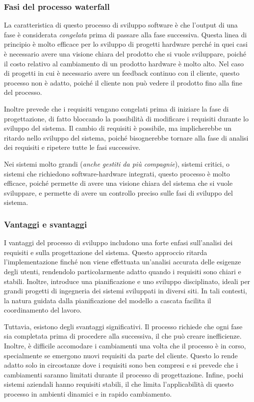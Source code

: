 \subsubsection{Fasi del processo waterfall}
La caratteristica di questo processo di sviluppo software è che l'output di una 
fase è considerata \textit{congelata} prima di passare alla fase successiva. 
Questa linea di principio è molto efficace per lo sviluppo di progetti hardware perché 
in quei casi è necessario avere una visione chiara del prodotto che si vuole sviluppare,
poiché il costo relativo al cambiamento di un prodotto hardware è molto alto.
Nel caso di progetti in cui è necessario avere un feedback continuo con il cliente,
questo processo non è adatto, poiché il cliente non può vedere il prodotto fino alla
fine del processo.

Inoltre prevede che i requisiti vengano congelati prima di iniziare la fase di progettazione,
di fatto bloccando la possibilità di modificare i requisiti durante lo sviluppo del sistema.
Il cambio di requisiti è possibile, ma implicherebbe un ritardo nello sviluppo del sistema,
poiché bisognerebbe tornare alla fase di analisi dei requisiti e ripetere tutte le fasi
successive.

Nei sistemi molto grandi (\textit{anche gestiti da più compagnie}), sistemi critici,
o sistemi che richiedono software-hardware integrati, questo processo
è molto efficace, poiché permette di avere una visione chiara del sistema che si vuole
sviluppare, e permette di avere un controllo preciso sulle fasi di sviluppo del sistema.
\subsubsection{Vantaggi e svantaggi}
I vantaggi del processo di sviluppo includono una forte enfasi sull'analisi dei
requisiti e sulla progettazione del sistema. Questo approccio ritarda l'implementazione
finché non viene effettuata un'analisi accurata delle esigenze degli utenti, rendendolo
particolarmente adatto quando i requisiti sono chiari e stabili. Inoltre, introduce una
pianificazione e uno sviluppo disciplinato, ideali per grandi progetti di ingegneria dei
sistemi sviluppati in diversi siti. In tali contesti, la natura guidata dalla
pianificazione del modello a cascata facilita il coordinamento del lavoro.

Tuttavia, esistono degli svantaggi significativi. Il processo richiede che ogni fase
sia completata prima di procedere alla successiva, il che può creare inefficienze.
Inoltre, è difficile accomodare i cambiamenti una volta che il processo è in corso,
specialmente se emergono nuovi requisiti da parte del cliente. Questo lo rende adatto
solo in circostanze dove i requisiti sono ben compresi e si prevede che i cambiamenti
saranno limitati durante il processo di progettazione. Infine, pochi sistemi aziendali
hanno requisiti stabili, il che limita l'applicabilità di questo processo in ambienti
dinamici e in rapido cambiamento.

